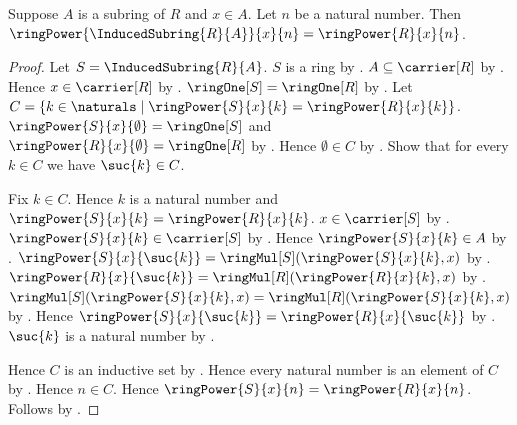 \begin{theorem}\label{induced_subring_power_agreement}
    Suppose $A$ is a subring of $R$ and $x\in A$.
    Let $n$ be a natural number.
    Then $\ringPower{\InducedSubring{R}{A}}{x}{n}
        =\ringPower{R}{x}{n}$.
\end{theorem}
\begin{proof}
    Let $S=\InducedSubring{R}{A}$.
    $S$ is a ring by .
    $A\subseteq\carrier[R]$ by .
    Hence $x\in\carrier[R]$ by .
    $\ringOne[S]=\ringOne[R]$ by .
    Let $C=\{k\in\naturals\mid
        \ringPower{S}{x}{k}=\ringPower{R}{x}{k}\}$.
    $\ringPower{S}{x}{\emptyset}=\ringOne[S]$ and
        $\ringPower{R}{x}{\emptyset}=\ringOne[R]$ by
        .
    Hence $\emptyset\in C$ by .
    Show that for every $k\in C$ we have $\suc{k}\in C$.
    \begin{subproof}
        Fix $k\in C$.
        Hence $k$ is a natural number and
            $\ringPower{S}{x}{k}=\ringPower{R}{x}{k}$.
        $x\in\carrier[S]$ by .
        $\ringPower{S}{x}{k}\in\carrier[S]$ by .
        Hence $\ringPower{S}{x}{k}\in A$ by
            .
        $\ringPower{S}{x}{\suc{k}}
            =\ringMul[S](\ringPower{S}{x}{k},x)$ by
            .
        $\ringPower{R}{x}{\suc{k}}
            =\ringMul[R](\ringPower{R}{x}{k},x)$ by
            .
        $\ringMul[S](\ringPower{S}{x}{k},x)
            =\ringMul[R](\ringPower{S}{x}{k},x)$ by
            .
        Hence $\ringPower{S}{x}{\suc{k}}=\ringPower{R}{x}{\suc{k}}$ by
            \auto.
        $\suc{k}$ is a natural number by .
    \end{subproof}
    Hence $C$ is an inductive set by .
    Hence every natural number is an element of $C$ by
        .
    Hence $n\in C$.
    Hence $\ringPower{S}{x}{n}=\ringPower{R}{x}{n}$.
    Follows by \auto.
\end{proof}


